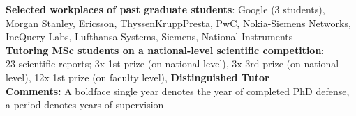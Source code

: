 \documentclass{xetexCV}
\begin{document}
\textbf{Selected workplaces of past graduate students}: Google (3 students), Morgan Stanley, Ericsson, ThyssenKruppPresta, PwC, Nokia-Siemens Networks, 
IncQuery Labs, Lufthansa Systems, Siemens, National Instruments \\

\textbf{Tutoring MSc students on a national-level scientific competition}: \\
23 scientific reports; 3x 1st prize (on national level), 3x 3rd prize (on national
level), 12x 1st prize (on faculty level), %
\textbf{Distinguished Tutor}  \\%

\textbf{Comments:} A boldface single year denotes the year of completed PhD defense, a period denotes years of supervision \\
\end{document}
